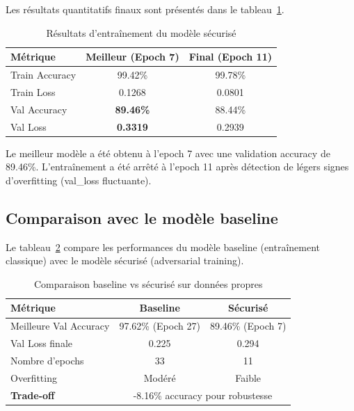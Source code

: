 Les résultats quantitatifs finaux sont présentés dans le tableau~\ref{tab:secured_training_results}.

\begin{table}[H]
    \centering
    \caption{Résultats d'entraînement du modèle sécurisé}
    \label{tab:secured_training_results}
    \begin{tabular}{lcc}
        \toprule
        \textbf{Métrique} & \textbf{Meilleur (Epoch 7)} & \textbf{Final (Epoch 11)} \\
        \midrule
        Train Accuracy & 99.42\% & 99.78\% \\
        Train Loss & 0.1268 & 0.0801 \\
        Val Accuracy & \textbf{89.46\%} & 88.44\% \\
        Val Loss & \textbf{0.3319} & 0.2939 \\
        \bottomrule
    \end{tabular}
\end{table}

Le meilleur modèle a été obtenu à l'epoch 7 avec une validation accuracy de 89.46\%. L'entraînement a été arrêté à l'epoch 11 après détection de légers signes d'overfitting (val\_loss fluctuante).

\subsection{Comparaison avec le modèle baseline}

Le tableau~\ref{tab:baseline_vs_secured} compare les performances du modèle baseline (entraînement classique) avec le modèle sécurisé (adversarial training).

\begin{table}[H]
    \centering
    \caption{Comparaison baseline vs sécurisé sur données propres}
    \label{tab:baseline_vs_secured}
    \begin{tabular}{lcc}
        \toprule
        \textbf{Métrique} & \textbf{Baseline} & \textbf{Sécurisé} \\
        \midrule
        Meilleure Val Accuracy & 97.62\% (Epoch 27) & 89.46\% (Epoch 7) \\
        Val Loss finale & 0.225 & 0.294 \\
        Nombre d'epochs & 33 & 11 \\
        Overfitting & Modéré & Faible \\
        \midrule
        \textbf{Trade-off} & \multicolumn{2}{c}{-8.16\% accuracy pour robustesse} \\
        \bottomrule
    \end{tabular}
\end{table}

